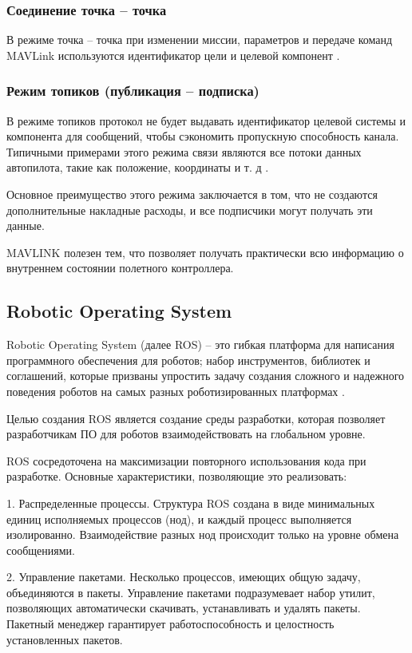 \subsubsection{Соединение точка -- точка}
В режиме точка -- точка при изменении миссии, параметров и передаче команд MAV\-Link используются идентификатор цели и целевой компонент \cite{mavlink}.

\subsubsection{Режим топиков (публикация -- подписка)}
В режиме топиков протокол не будет выдавать идентификатор целевой системы и компонента для сообщений, чтобы сэкономить пропускную способность канала. Типичными примерами этого режима связи являются все потоки данных автопилота, такие как положение, координаты и т. д \cite{mavlink}.

Основное преимущество этого режима заключается в том, что не создаются дополнительные накладные расходы, и все подписчики могут получать эти данные.

MAVLINK полезен тем, что позволяет получать практически всю информацию о внутреннем состоянии полетного контроллера.

\subsection{Robotic Operating System}

Robotic Operating System (далее ROS) -- это гибкая платформа для написания программного обеспечения для роботов; набор инструментов, библиотек и соглашений, которые призваны упростить задачу создания сложного и надежного поведения роботов на самых разных роботизированных платформах \cite{ros}.

Целью создания ROS является создание среды разработки, которая позволяет разработчикам ПО для роботов взаимодействовать на глобальном уровне.

ROS сосредоточена на максимизации повторного использования кода при разработке. Основные характеристики, позволяющие это реализовать:

1. Распределенные процессы. Структура ROS создана в виде минимальных единиц исполняемых процессов (нод), и каждый процесс выполняется изолированно. Взаимодействие разных нод происходит только на уровне обмена сообщениями.

2. Управление пакетами. Несколько процессов, имеющих общую задачу, объединяются в пакеты. Управление пакетами подразумевает набор утилит, позволяющих автоматически скачивать, устанавливать и удалять пакеты. Пакетный менеджер гарантирует работоспособность и целостность установленных пакетов.

